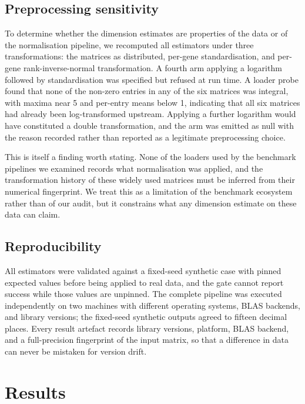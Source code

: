 \documentclass[journal,twoside,web]{ieeecolor}
\begin{document}
\subsection{Preprocessing sensitivity}
To determine whether the dimension estimates are properties of the data or of
the normalisation pipeline, we recomputed all estimators under three
transformations: the matrices as distributed, per-gene standardisation, and
per-gene rank-inverse-normal transformation. A fourth arm applying a logarithm
followed by standardisation was specified but refused at run time. A loader
probe found that none of the non-zero entries in any of the six matrices was
integral, with maxima near 5 and per-entry means below 1, indicating that all
six matrices had already been log-transformed upstream. Applying a further
logarithm would have constituted a double transformation, and the arm was
emitted as null with the reason recorded rather than reported as a legitimate
preprocessing choice.

This is itself a finding worth stating. None of the loaders used by the
benchmark pipelines we examined records what normalisation was applied, and
the transformation history of these widely used matrices must be inferred from
their numerical fingerprint. We treat this as a limitation of the benchmark
ecosystem rather than of our audit, but it constrains what any dimension
estimate on these data can claim.

\subsection{Reproducibility}
All estimators were validated against a fixed-seed synthetic case with pinned
expected values before being applied to real data, and the gate cannot report
success while those values are unpinned. The complete pipeline was executed
independently on two machines with different operating systems, BLAS backends,
and library versions; the fixed-seed synthetic outputs agreed to fifteen
decimal places. Every result artefact records library versions, platform, BLAS
backend, and a full-precision fingerprint of the input matrix, so that a
difference in data can never be mistaken for version drift.

\section{Results}
\label{sec:results}
\end{document}
